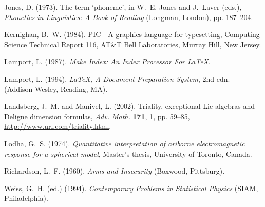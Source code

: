 \begin{thebibliography}{99}
Jones, D. (1973). {The term `phoneme'}, in W.~E. Jones and J.~Laver
  (eds.), \emph{Phonetics in Linguistics: A Book of Reading} (Longman, London),
  pp. 187--204.

Kernighan, B.~W. (1984). {PIC}---{A} graphics language for
  typesetting, Computing Science Technical Report 116, AT\&T Bell
  Laboratories, Murray Hill, New Jersey.

Lamport, L. (1987). \emph{Make Index: An Index Processor For LaTeX}.

Lamport, L. (1994). \emph{\LaTeX, A Document Preparation System}, 2nd edn.
  (Addison-Wesley, Reading, MA).

Landsberg, J.~M. and Manivel, L. (2002). Triality, exceptional {L}ie
  algebras and {D}eligne dimension formulas, \emph{Adv. Math.} \textbf{171},
  1, pp. 59--85, \url{http://www.url.com/triality.html}.

Lodha, G.~S. (1974). \emph{Quantitative interpretation of ariborne
  electromagnetic response for a spherical model}, Master's thesis, University
  of Toronto, Canada.

Richardson, L.~F. (1960). \emph{Arms and {I}nsecurity} (Boxwood, Pittsburg).

Weiss, G.~H. (ed.) (1994). \emph{Contemporary {P}roblems in {S}tatistical
  {P}hysics} (SIAM, Philadelphia).

\end{thebibliography}
